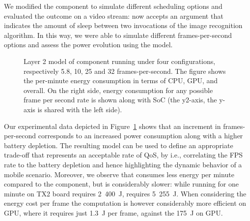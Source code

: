 We modified the  component to simulate different scheduling options and evaluated the outcome on a video stream:  now %
accepts an argument that indicates the amount of sleep between two invocations of the image recognition algorithm. In this way, we were able to simulate different frames-per-second options and assess the power evolution using the model. %

\begin{figure}[t]
  \centering
  \caption[Layer 2 model of  component]{Layer 2 model of  component running under four configurations, respectively 5.8, 10, 25 and 32 frames-per-second. The figure shows the per-minute energy consumption in terms of CPU, GPU, and overall. On the right side, energy consumption for any possible frame per second rate is shown along with SoC (the y2-axis, the y-axis is shared with the left side).}
  \label{fig:darknet-layer2}
\end{figure}

Our experimental data depicted in Figure~\ref{fig:darknet-layer2} shows that an increment in frames-per-second corresponds to an increased power consumption along with a higher battery depletion. The resulting model can be used to define an appropriate trade-off that represents an acceptable rate of QoS, by i.e., correlating the FPS rate to the battery depletion and hence highlighting the dynamic behavior of a mobile scenario.
Moreover, we observe that  consumes less energy per minute compared to the  component, but is considerably slower: while running  for one minute on TX2 board requires 2~400~J,  requires 5~255~J. When considering the energy cost per frame the computation is however considerably more efficient on GPU, where it requires just 1.3~J per frame, against the 175~J on GPU. %

